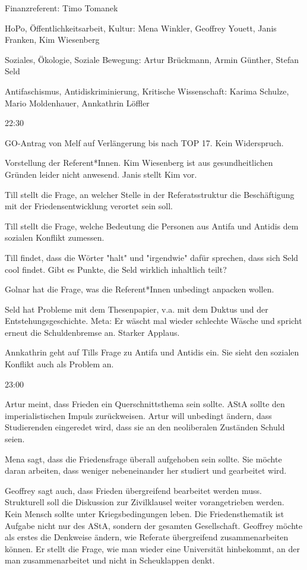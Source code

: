 \documentclass[ngerman,headheight=70pt]{scrartcl}
\begin{document}
    Finanzreferent:
    Timo Tomanek

    HoPo, Öffentlichkeitsarbeit, Kultur:
    Mena Winkler, Geoffrey Youett, Janis Franken, Kim Wiesenberg

    Soziales, Ökologie, Soziale Bewegung:
    Artur Brückmann, Armin Günther, Stefan Seld

    Antifaschismus, Antidiskriminierung, Kritische Wissenschaft:
    Karima Schulze, Mario Moldenhauer, Annkathrin Löffler

    22:30

    GO-Antrag von Melf auf Verlängerung bis nach TOP 17. Kein Widerspruch.

    Vorstellung der Referent*Innen. Kim Wiesenberg ist aus gesundheitlichen
    Gründen leider nicht anwesend. Janis stellt Kim vor.

    Till stellt die Frage, an welcher Stelle in der Referatsstruktur die
    Beschäftigung mit der Friedensentwicklung verortet sein soll.

    Till stellt die Frage, welche Bedeutung die Personen aus Antifa und Antidis
    dem sozialen Konflikt zumessen.

    Till findet, dass die Wörter "halt" und "irgendwie" dafür sprechen, dass sich
    Seld cool findet. Gibt es Punkte, die Seld wirklich inhaltlich teilt?

    Golnar hat die Frage, was die Referent*Innen unbedingt anpacken wollen.

    Seld hat Probleme mit dem Thesenpapier, v.a. mit dem Duktus und der
    Entstehungsgeschichte.
    Meta: Er wäscht mal wieder schlechte Wäsche und spricht erneut die
    Schuldenbremse an. Starker Applaus.

    Annkathrin geht auf Tills Frage zu Antifa und Antidis ein. Sie sieht
    den sozialen Konflikt auch als Problem an.

    23:00

    Artur meint, dass Frieden ein Querschnittsthema sein sollte. AStA sollte
    den imperialistischen Impuls zurückweisen. Artur will unbedingt ändern,
    dass Studierenden eingeredet wird, dass sie an den neoliberalen Zuständen
    Schuld seien.

    Mena sagt, dass die Friedensfrage überall aufgehoben sein sollte.
    Sie möchte daran arbeiten, dass weniger nebeneinander her studiert und
    gearbeitet wird.

    Geoffrey sagt auch, dass Frieden übergreifend bearbeitet werden muss.
    Strukturell soll die Diskussion zur Zivilklausel weiter vorangetrieben werden.
    Kein Mensch sollte unter Kriegsbedingungen leben. Die Friedensthematik
    ist Aufgabe nicht nur des AStA, sondern der gesamten Gesellschaft.
    Geoffrey möchte als erstes die Denkweise ändern, wie Referate übergreifend
    zusammenarbeiten können. Er stellt die Frage, wie man wieder eine Universität
    hinbekommt, an der man zusammenarbeitet und nicht in Scheuklappen denkt.
\end{document}
